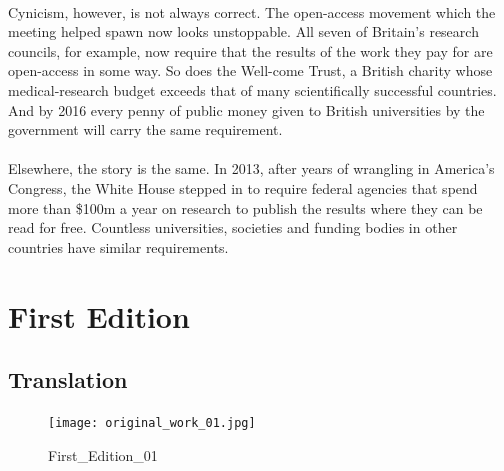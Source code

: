 \documentclass[a4paper, 12pt, UTF8]{article}
\begin{document}
\paragraph*{}
    Cynicism, however, is not always correct. The open-access movement which the meeting helped spawn now looks unstoppable. All seven of Britain’s research councils, for example, now require that the results of the work they pay for are open-access in some way. So does the Well-come Trust, a British charity whose medical-research budget exceeds that of many scientifically successful countries. And by 2016 every penny of public money given to British universities by the government will carry the same requirement.

\paragraph*{}
    Elsewhere, the story is the same. In 2013, after years of wrangling in America’s Congress, the White House stepped in to require federal agencies that spend more than \$100m a year on research to publish the results where they can be read for free. Countless universities, societies and funding bodies in other countries have similar requirements.

\newpage
\section{First Edition}
\subsection{Translation}
\begin{figure}[H]
    \centering
    \texttt{[image: original\_work\_01.jpg]}
    \caption{First\_Edition\_01}
    \label{Fig:1}
\end{figure}
\end{document}
